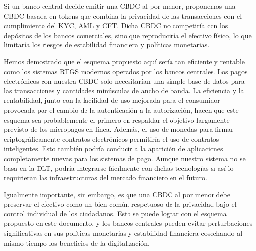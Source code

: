 \documentclass[a4paper,10pt]{article} %
\begin{document}
Si un banco central decide emitir una CBDC al por menor, proponemos una
CBDC basada en tokens que combina la privacidad de las transacciones con
el cumplimiento del KYC, AML y CFT. Dicha CBDC no competiría con los
depósitos de los bancos comerciales, sino que reproduciría el efectivo
físico, lo que limitaría los riesgos de estabilidad financiera y
políticas monetarias.

Hemos demostrado que el esquema propuesto aquí sería tan eficiente y
rentable como los sistemas RTGS modernos operados por los bancos
centrales. Los pagos electrónicos con nuestra CBDC solo necesitarían una
simple base de datos para las transacciones y cantidades minúsculas de
ancho de banda. La eficiencia y la rentabilidad, junto con la facilidad
de uso mejorada para el consumidor provocada por el cambio de la
autenticación a la autorización, hacen que este esquema sea
probablemente el primero en respaldar el objetivo largamente previsto de
los micropagos en línea. Además, el uso de monedas para firmar
criptográficamente contratos electrónicos permitiría el uso de contratos
inteligentes. Esto también podría conducir a la aparición de
aplicaciones completamente nuevas para los sistemas de pago. Aunque
nuestro sistema no se basa en la DLT, podría integrarse fácilmente con
dichas tecnologías si así lo requirieran las infraestructuras del
mercado financiero en el futuro.

Igualmente importante, sin embargo, es que una CBDC al por menor debe
preservar el efectivo como un bien común respetuoso de la privacidad
bajo el control individual de los ciudadanos. Esto se puede lograr con
el esquema propuesto en este documento, y los bancos centrales pueden
evitar perturbaciones significativas en sus políticas monetarias y
estabilidad financiera cosechando al mismo tiempo los beneficios de la
digitalización.


\newpage


\end{document}
